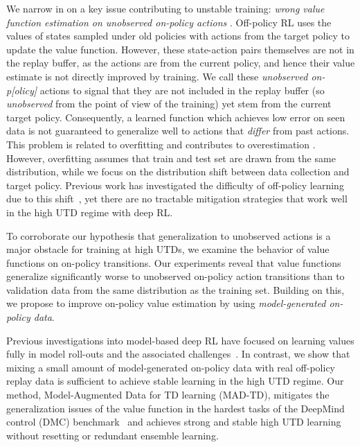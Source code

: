 We narrow in on a key issue contributing to unstable training: \emph{wrong value function estimation on unobserved on-policy actions} \parencite{thrun1993issues,tsitsiklis1996analysis}.
Off-policy RL uses the values of states sampled under old policies with actions from the target policy to update the value function.
However, these state-action pairs themselves are not in the replay buffer, as the actions are from the current policy, and hence their value estimate is not directly improved by training.
We call these \emph{unobserved on-p[olicy]} actions to signal that they are not included in the replay buffer (so \emph{unobserved} from the point of view of the training) yet stem from the current target policy.
Consequently, a learned function which achieves low error on seen data is not guaranteed to generalize well to actions that \emph{differ} from past actions.
This problem is related to overfitting \parencite{li2023efficient} and contributes to overestimation \parencite{thrun1993issues,hasselt2010double,fujimoto2018addressing}.
However, overfitting assumes that train and test set are drawn from the same distribution, while we focus on the distribution shift between data collection and target policy.
Previous work has investigated the difficulty of off-policy learning due to this shift~\parencite{maei2009convergent,sutton2016emphatic,hasselt2010double,fujimoto2018addressing}, yet there are no tractable mitigation strategies that work well in the high UTD regime with deep RL.

To corroborate our hypothesis that generalization to unobserved actions is a major obstacle for training at high UTDs, we examine the behavior of value functions on on-policy transitions. 
Our experiments reveal that value functions generalize significantly worse to unobserved on-policy action transitions than to validation data from the same distribution as the training set.
Building on this, we propose to improve on-policy value estimation by using \emph{model-generated on-policy data}.

Previous investigations into model-based deep RL have focused on learning values fully in model roll-outs \parencite{buckman2018sample,janner2019mbpo,hafner2020dream,ghugare2023simplifying} and the associated challenges~\parencite{zhao2023simplified,hansen2024tdmpc}.
In contrast, we show that mixing a small amount of model-generated on-policy data with real off-policy replay data is sufficient to achieve stable learning in the high UTD regime.
Our method, Model-Augmented Data for TD learning (MAD-TD), mitigates the generalization issues of the value function in the hardest tasks of the DeepMind control (DMC) benchmark~\parencite{tunyasuvunakool2020dmcontrol} and achieves strong and stable high UTD learning without resetting or redundant ensemble learning. 

